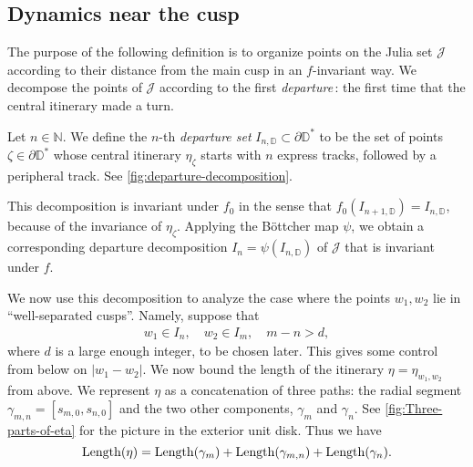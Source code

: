 \subsection{Dynamics near the cusp}

The purpose of the following definition is to organize points on the Julia set $\mathcal J$ according to their distance from the main cusp in an $f$-invariant way. We decompose the points of $\mathcal J$ according to the first \emph{departure}\,: the first time that the central itinerary made a turn.


\begin{definition}
Let $n \in \mathbb N$. We define the $n$-th \emph{departure set} $I_{n, \mathbb D} \subset \partial \mathbb D ^*$ to be the set of points $\zeta \in \partial \mathbb D^*$ whose central itinerary $\eta_{\zeta}$ starts with $n$ express tracks, followed by a peripheral track.
See \cref{fig:departure-decomposition}.
\end{definition}


This decomposition is invariant under $f_0$ in the sense that $f_0(I_{n+1, \mathbb D})=I_{n, \mathbb D}$, because of the invariance of $\eta _\zeta$.
Applying the Böttcher map $\psi$, we obtain a corresponding departure decomposition $I_n = \psi(I_{n, \mathbb D})$ of $\mathcal J$ that is invariant under $f$.

We now use this decomposition to analyze the case where the points $w_1,w_2$ lie in ``well-separated cusps''. Namely, suppose that
\begin{align} \label{parabolic separation}
	w_1 \in I_n, \quad w_2 \in I_m, \quad m-n > d,
\end{align}
where $d$ is a large enough integer, to be chosen later. 
This gives some control from below on $|w_1-w_2|$. We now bound the length of the itinerary $\eta=\eta_{w_1,w_2}$ from above.
We represent $\eta$ as a concatenation of three paths: the radial segment $\gamma_{m,n}=[s_{m,0},s_{n,0}]$ and the two other components, $\gamma _m$ and $\gamma_n$. See \cref{fig:Three-parts-of-eta} for the picture in the exterior unit disk.
Thus we have
\begin{equation}
	\operatorname{Length}(\eta)=\operatorname{Length}(\gamma_m)+\operatorname{Length}(\gamma_{m,n})+\operatorname{Length}(\gamma_n).
\end{equation}




